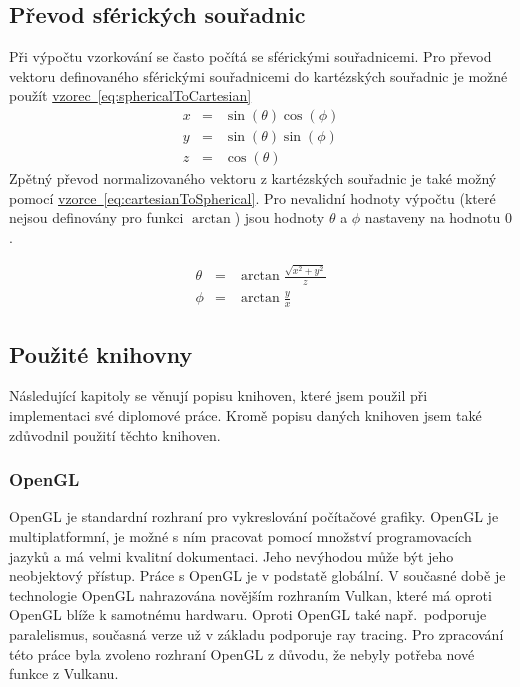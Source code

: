 \documentclass[czech,master]{diploma}
\begin{document}
\subsection{Převod sférických souřadnic}
Při výpočtu vzorkování se často počítá se sférickými souřadnicemi. Pro převod vektoru definovaného sférickými souřadnicemi do kartézských souřadnic je možné použít \hyperref[eq:sphericalToCartesian]{vzorec~\ref{eq:sphericalToCartesian}}
\begin{eqnarray}
  x & = & \sin(\theta)\cos(\phi)\nonumber \\
  y & = & \sin(\theta)\sin(\phi)\nonumber \\
  z & = & \cos(\theta)\label{eq:sphericalToCartesian}
\end{eqnarray}
Zpětný převod normalizovaného vektoru z kartézských souřadnic je také možný pomocí \hyperref[eq:cartesianToSpherical]{vzorce~\ref{eq:cartesianToSpherical}}. Pro nevalidní hodnoty výpočtu (které nejsou definovány pro funkci \(\arctan\)) jsou hodnoty \(\theta\) a \(\phi\) nastaveny na hodnotu \(0\).

\begin{eqnarray}
  \theta & = & \arctan \frac{\sqrt{x^2 + y^2}}{z} \nonumber \\
  \phi & = & \arctan \frac{y}{x}\label{eq:cartesianToSpherical}
\end{eqnarray}

\subsection{Použité knihovny}
Následující kapitoly se věnují popisu knihoven, které jsem použil při implementaci své diplomové práce. Kromě popisu daných knihoven jsem také zdůvodnil použití těchto knihoven.

\subsubsection*{OpenGL}
OpenGL je standardní rozhraní pro vykreslování počítačové grafiky. OpenGL je multiplatformní, je možné s ním pracovat pomocí množství programovacích jazyků a má velmi kvalitní dokumentaci. Jeho nevýhodou může být jeho neobjektový přístup. Práce s OpenGL je v podstatě globální. V současné době je technologie OpenGL nahrazována novějším rozhraním Vulkan, které má oproti OpenGL blíže k samotnému hardwaru. Oproti OpenGL také např.\ podporuje paralelismus, současná verze už v základu podporuje ray tracing. Pro zpracování této práce byla zvoleno rozhraní OpenGL z důvodu, že nebyly potřeba nové funkce z Vulkanu.
\end{document}
